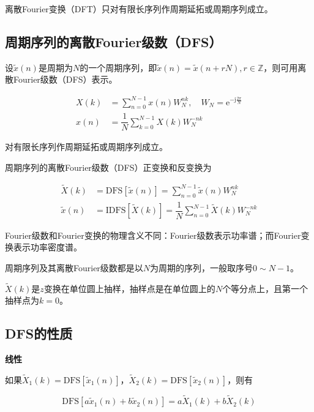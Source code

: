 \documentclass[cn, hazy, blue, normal, 14pt]{elegantnote}
\begin{document}
离散Fourier变换（DFT）只对有限长序列作周期延拓或周期序列成立。

\subsection{周期序列的离散Fourier级数（DFS）}

设$\widetilde{x}(n)$是周期为$N$的一个周期序列，即$\widetilde{x}(n)=\widetilde{x}(n+rN), r\in\mathbb{Z}$，则可用离散Fourier级数（DFS）表示。

\begin{equation}
\begin{aligned}
    X(k)&=\sum_{n=0}^{N-1}{x(n)W_{N}^{nk}}, \quad W_{N}=\text{e}^{-\text{j}\frac{2\pi}{N}} \\
    x(n)&=\dfrac{1}{N}\sum_{k=0}^{N-1}{X(k)W_{N}^{-nk}}
\end{aligned}
\end{equation}

对有限长序列作周期延拓或周期序列成立。

周期序列的离散Fourier级数（DFS）正变换和反变换为

\begin{equation}
\begin{aligned}
    \widetilde{X}(k)&=\text{DFS}[\widetilde{x}(n)]=\sum_{n=0}^{N-1}{\widetilde{x}(n)W_{N}^{nk}} \\
    \widetilde{x}(n)&=\text{IDFS}[\widetilde{X}(k)]=\dfrac{1}{N}\sum_{n=0}^{N-1}{\widetilde{X}(k)W_{N}^{-nk}}
\end{aligned}
\end{equation}

Fourier级数和Fourier变换的物理含义不同：Fourier级数表示功率谱；而Fourier变换表示功率密度谱。

周期序列及其离散Fourier级数都是以$N$为周期的序列，一般取序号$0\sim N-1$。

$\widetilde{X}(k)$是$z$变换在单位圆上抽样，抽样点是在单位圆上的$N$个等分点上，且第一个抽样点为$k=0$。

\subsection{DFS的性质}

\textbf{线性}

如果$\widetilde{X}_1(k)=\text{DFS}[\widetilde{x}_1(n)]$，$\widetilde{X}_2(k)=\text{DFS}[\widetilde{x}_2(n)]$，则有

\begin{equation}
    \text{DFS}[a\widetilde{x}_1(n)+b\widetilde{x}_2(n)]=a\widetilde{X}_1(k)+b\widetilde{X}_2(k)
\end{equation}
\end{document}

